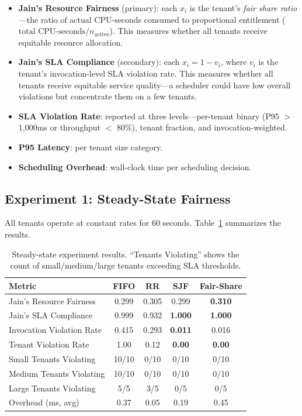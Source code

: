 \documentclass[runningheads]{llncs}
\begin{document}
\begin{itemize}
    \item \textbf{Jain's Resource Fairness} (primary): each $x_i$ is the tenant's \emph{fair share ratio}---the ratio of actual CPU-seconds consumed to proportional entitlement ($\text{total CPU-seconds} / n_{\text{active}}$). This measures whether all tenants receive equitable resource allocation.
    \item \textbf{Jain's SLA Compliance} (secondary): each $x_i = 1 - v_i$, where $v_i$ is the tenant's invocation-level SLA violation rate. This measures whether all tenants receive equitable service quality---a scheduler could have low overall violations but concentrate them on a few tenants.
    \item \textbf{SLA Violation Rate}: reported at three levels---per-tenant binary (P95 $>$ 1,000ms or throughput $<$ 80\%), tenant fraction, and invocation-weighted.
    \item \textbf{P95 Latency}: per tenant size category.
    \item \textbf{Scheduling Overhead}: wall-clock time per scheduling decision.
\end{itemize}

\subsection{Experiment 1: Steady-State Fairness}

All tenants operate at constant rates for 60 seconds. Table~\ref{tab:steady} summarizes the results.

\begin{table}[!ht]
\centering
\caption{Steady-state experiment results. ``Tenants Violating'' shows the count of small/medium/large tenants exceeding SLA thresholds.}\label{tab:steady}
\small
\begin{tabular}{@{}lcccc@{}}
\toprule
\textbf{Metric} & \textbf{FIFO} & \textbf{RR} & \textbf{SJF} & \textbf{Fair-Share} \\
\midrule
Jain's Resource Fairness & 0.299 & 0.305 & 0.299 & \textbf{0.310} \\
Jain's SLA Compliance & 0.999 & 0.932 & \textbf{1.000} & \textbf{1.000} \\
Invocation Violation Rate & 0.415 & 0.293 & \textbf{0.011} & 0.016 \\
Tenant Violation Rate & 1.00 & 0.12 & \textbf{0.00} & \textbf{0.00} \\
\midrule
Small Tenants Violating & 10/10 & 0/10 & 0/10 & 0/10 \\
Medium Tenants Violating & 10/10 & 0/10 & 0/10 & 0/10 \\
Large Tenants Violating & 5/5 & 3/5 & 0/5 & 0/5 \\
\midrule
Overhead (ms, avg) & 0.37 & 0.05 & 0.19 & 0.45 \\
\bottomrule
\end{tabular}
\end{table}
\end{document}
